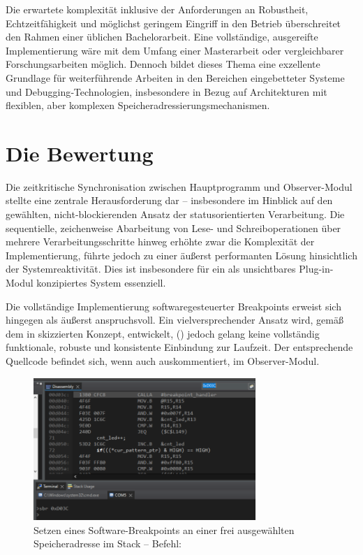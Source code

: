 Die erwartete komplexit\"at inklusive der Anforderungen an Robustheit, Echtzeitf\"ahigkeit und m\"oglichst geringem Eingriff in den Betrieb \"uberschreitet den Rahmen einer \"ublichen Bachelorarbeit. Eine vollst\"andige, ausgereifte Implementierung w\"are mit dem Umfang einer Masterarbeit oder vergleichbarer Forschungsarbeiten m\"oglich. Dennoch bildet dieses Thema eine exzellente Grundlage f\"ur weiterf\"uhrende Arbeiten in den Bereichen eingebetteter Systeme und Debugging‑Technologien, insbesondere in Bezug auf Architekturen mit flexiblen, aber komplexen Speicheradressierungsmechanismen.


\vspace{1.0cm}
\section{Die Bewertung}
\label{sec:Bewertung}
Die zeitkritische Synchronisation zwischen Hauptprogramm und Observer-Modul stellte eine zentrale Herausforderung dar -- insbesondere im Hinblick auf den gew\"ahlten, nicht-blockierenden Ansatz der statusorientierten Verarbeitung. Die sequentielle, zeichenweise Abarbeitung von Lese- und Schreiboperationen \"uber mehrere Verarbeitungsschritte hinweg erh\"ohte zwar die Komplexit\"at der Implementierung, f\"uhrte jedoch zu einer \"au{\ss}erst performanten L\"osung hinsichtlich der Systemreaktivit\"at. Dies ist insbesondere f\"ur ein als \glqq{}unsichtbares\grqq{} Plug-in-Modul konzipiertes System essenziell.

\newpage
Die vollst\"andige Implementierung softwaregesteuerter Breakpoints erweist sich hingegen als \"au{\ss}erst anspruchsvoll. Ein vielversprechender Ansatz wird, gem\"a{\ss} dem in  skizzierten Konzept, entwickelt, () jedoch gelang keine vollst\"andig funktionale, robuste und konsistente Einbindung zur Laufzeit. Der entsprechende Quellcode befindet sich, wenn auch auskommentiert, im Observer-Modul.

\begin{figure}[h!]
	\centering
	\includegraphics[width=0.75\textwidth]{../Bilder/ObserverModule/set_breakpoint.png}
	\caption{Setzen eines Software-Breakpoints an einer frei ausgew\"ahlten Speicheradresse im Stack -- Befehl: }
	\label{fig:software_breakpoint}
\end{figure}

